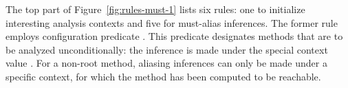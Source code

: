 


The top part of Figure~\ref{fig:rules-must-1} lists six rules: one to
initialize interesting analysis contexts and five for must-alias inferences.
The former rule employs configuration predicate . This
predicate designates methods that are to be analyzed unconditionally: the
inference is made under the special context value .  For a
non-root method, aliasing inferences can only be made under a specific context,
for which the method has been computed to be reachable. 

